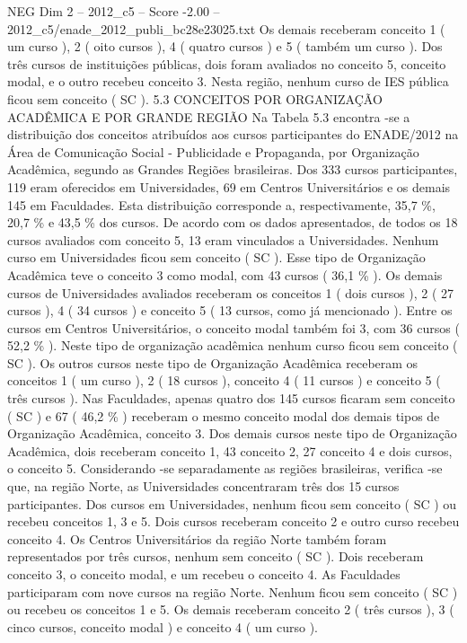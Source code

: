 \begin{textsample}{NEG Dim 2 – 2012\_c5 – Score -2.00 – 2012\_c5/enade\_2012\_publi\_bc28e23025.txt}
Os demais receberam conceito 1 ( um curso ), 2 ( oito cursos ), 4 ( quatro cursos ) e 5 ( também um curso ).
Dos três cursos de instituições públicas, dois foram avaliados no conceito 5, conceito modal, e o outro recebeu conceito 3.
Nesta região, nenhum curso de IES pública ficou sem conceito ( SC ). 5.3 CONCEITOS POR ORGANIZAÇÃO ACADÊMICA E POR GRANDE REGIÃO Na Tabela 5.3 encontra -se a distribuição dos conceitos atribuídos aos cursos participantes do ENADE/2012 na Área de Comunicação Social - Publicidade e Propaganda, por Organização Acadêmica, segundo as Grandes Regiões brasileiras.
Dos 333 cursos participantes, 119 eram oferecidos em Universidades, 69 em Centros Universitários e os demais 145 em Faculdades.
Esta distribuição corresponde a, respectivamente, 35,7 \%, 20,7 \% e 43,5 \% dos cursos.
De acordo com os dados apresentados, de todos os 18 cursos avaliados com conceito 5, 13 eram vinculados a Universidades.
Nenhum curso em Universidades ficou sem conceito ( SC ).
Esse tipo de Organização Acadêmica teve o conceito 3 como modal, com 43 cursos ( 36,1 \% ).
Os demais cursos de Universidades avaliados receberam os conceitos 1 ( dois cursos ), 2 ( 27 cursos ), 4 ( 34 cursos ) e conceito 5 ( 13 cursos, como já mencionado ).
Entre os cursos em Centros Universitários, o conceito modal também foi 3, com 36 cursos ( 52,2 \% ).
Neste tipo de organização acadêmica nenhum curso ficou sem conceito ( SC ).
Os outros cursos neste tipo de Organização Acadêmica receberam os conceitos 1 ( um curso ), 2 ( 18 cursos ), conceito 4 ( 11 cursos ) e conceito 5 ( três cursos ).
Nas Faculdades, apenas quatro dos 145 cursos ficaram sem conceito ( SC ) e 67 ( 46,2 \% ) receberam o mesmo conceito modal dos demais tipos de Organização Acadêmica, conceito 3.
Dos demais cursos neste tipo de Organização Acadêmica, dois receberam conceito 1, 43 conceito 2, 27 conceito 4 e dois cursos, o conceito 5.
Considerando -se separadamente as regiões brasileiras, verifica -se que, na região Norte, as Universidades concentraram três dos 15 cursos participantes.
Dos cursos em Universidades, nenhum ficou sem conceito ( SC ) ou recebeu conceitos 1, 3 e 5.
Dois cursos receberam conceito 2 e outro curso recebeu conceito 4.
Os Centros Universitários da região Norte também foram representados por três cursos, nenhum sem conceito ( SC ).
Dois receberam conceito 3, o conceito modal, e um recebeu o conceito 4.
As Faculdades participaram com nove cursos na região Norte.
Nenhum ficou sem conceito ( SC ) ou recebeu os conceitos 1 e 5.
Os demais receberam conceito 2 ( três cursos ), 3 ( cinco cursos, conceito modal ) e conceito 4 ( um curso ).

\end{textsample}
